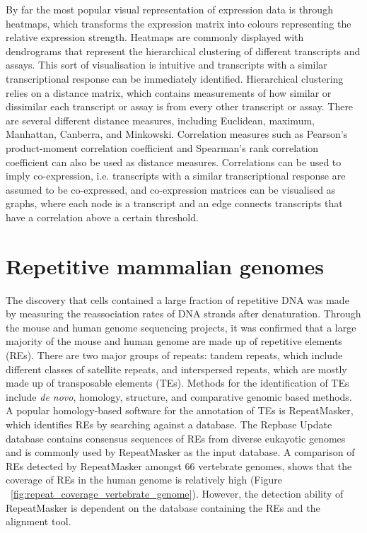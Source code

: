 By far the most popular visual representation of expression data is through heatmaps, which transforms the expression matrix into colours representing the relative expression strength. Heatmaps are commonly displayed with dendrograms that represent the hierarchical clustering of different transcripts and assays\cite{pmid9843981}. This sort of visualisation is intuitive and transcripts with a similar transcriptional response can be immediately identified. Hierarchical clustering relies on a distance matrix, which contains measurements of how similar or dissimilar each transcript or assay is from every other transcript or assay. There are several different distance measures, including Euclidean, maximum, Manhattan, Canberra, and Minkowski. Correlation measures such as Pearson's product-moment correlation coefficient and Spearman's rank correlation coefficient can also be used as distance measures. Correlations can be used to imply co-expression, i.e. transcripts with a similar transcriptional response are assumed to be co-expressed, and co-expression matrices can be visualised as graphs, where each node is a transcript and an edge connects transcripts that have a correlation above a certain threshold.

\section{Repetitive mammalian genomes}

The discovery that cells contained a large fraction of repetitive DNA was made by measuring the reassociation rates of DNA strands after denaturation\cite{Britten1968}. Through the mouse\cite{pmid12466850} and human\cite{venter2001sequence, lander2001initial} genome sequencing projects, it was confirmed that a large majority of the mouse and human genome are made up of repetitive elements (REs). There are two major groups of repeats: tandem repeats, which include different classes of satellite repeats, and interspersed repeats, which are mostly made up of transposable elements (TEs)\cite{pmid9666329}. Methods for the identification of TEs include \textit{de novo}, homology, structure, and comparative genomic based methods\cite{Bergman01112007}. A popular homology-based software for the annotation of TEs is RepeatMasker, which identifies REs by searching against a database\cite{pmid19274634}. The Repbase Update database\cite{pmid16093699} contains consensus sequences of REs from diverse eukayotic genomes and is commonly used by RepeatMasker as the input database. A comparison of REs detected by RepeatMasker amongst 66 vertebrate genomes, shows that the coverage of REs in the human genome is relatively high (Figure ~\ref{fig:repeat_coverage_vertebrate_genome}). However, the detection ability of RepeatMasker is dependent on the database containing the REs and the alignment tool.

